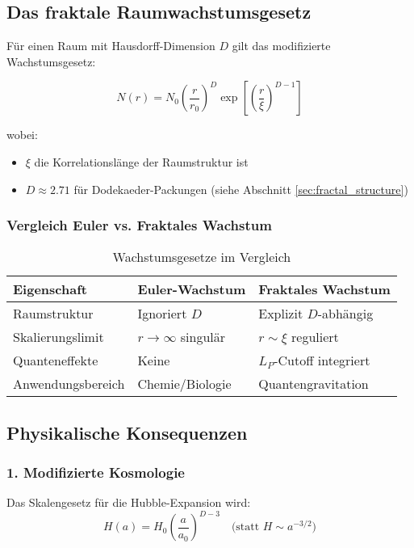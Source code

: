\subsection{Das fraktale Raumwachstumsgesetz}
\label{subsec:fractal_growth}

Für einen Raum mit Hausdorff-Dimension $D$ gilt das modifizierte Wachstumsgesetz:

\begin{equation}
N(r) = N_0 \left(\frac{r}{r_0}\right)^D \exp\left[\left(\frac{r}{\xi}\right)^{D-1}\right]
\end{equation}

wobei:
\begin{itemize}
\item $\xi$ die Korrelationslänge der Raumstruktur ist
\item $D \approx 2.71$ für Dodekaeder-Packungen (siehe Abschnitt \ref{sec:fractal_structure})
\end{itemize}

\subsubsection*{Vergleich Euler vs. Fraktales Wachstum}

\begin{table}[h]
\centering
\caption{Wachstumsgesetze im Vergleich}
\begin{tabular}{lll}
\toprule
\textbf{Eigenschaft} & \textbf{Euler-Wachstum} & \textbf{Fraktales Wachstum} \\
\midrule
Raumstruktur & Ignoriert $D$ & Explizit $D$-abhängig \\
Skalierungslimit & $r \to \infty$ singulär & $r \sim \xi$ reguliert \\
Quanteneffekte & Keine & $L_P$-Cutoff integriert \\
Anwendungsbereich & Chemie/Biologie & Quantengravitation \\
\bottomrule
\end{tabular}
\end{table}

\subsection{Physikalische Konsequenzen}
\label{subsec:physical_consequences}

\subsubsection*{1. Modifizierte Kosmologie}
Das Skalengesetz für die Hubble-Expansion wird:
\begin{equation}
H(a) = H_0 \left(\frac{a}{a_0}\right)^{D-3} \quad \text{(statt } H \sim a^{-3/2} \text{)}
\end{equation}

